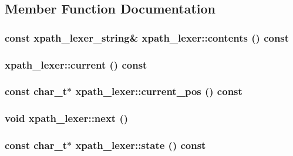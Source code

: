 \subsection{Member Function Documentation}
\hypertarget{classxpath__lexer_aebb02b6d507f5e0839bfa42116bdbc9c}{
\subsubsection[{contents}]{\setlength{\rightskip}{0pt plus 5cm}const {\bf xpath\_\-lexer\_\-string}\& xpath\_\-lexer::contents () const}}
\label{classxpath__lexer_aebb02b6d507f5e0839bfa42116bdbc9c}
\hypertarget{classxpath__lexer_a06cdc258948ef3a1a69bd7d5733fd987}{
\subsubsection[{current}]{ xpath\_\-lexer::current () const}}
\label{classxpath__lexer_a06cdc258948ef3a1a69bd7d5733fd987}
\hypertarget{classxpath__lexer_a7adef722d64938e3ba79ae1a7e1c0d71}{
\subsubsection[{current\_\-pos}]{\setlength{\rightskip}{0pt plus 5cm}const char\_\-t$\ast$ xpath\_\-lexer::current\_\-pos () const}}
\label{classxpath__lexer_a7adef722d64938e3ba79ae1a7e1c0d71}
\hypertarget{classxpath__lexer_a32684b3097fccb4d626da620b44b72ad}{
\subsubsection[{next}]{\setlength{\rightskip}{0pt plus 5cm}void xpath\_\-lexer::next ()}}
\label{classxpath__lexer_a32684b3097fccb4d626da620b44b72ad}
\hypertarget{classxpath__lexer_a3794e29f3bec2fa31346766eea978cbf}{
\subsubsection[{state}]{\setlength{\rightskip}{0pt plus 5cm}const char\_\-t$\ast$ xpath\_\-lexer::state () const}}
\label{classxpath__lexer_a3794e29f3bec2fa31346766eea978cbf}


